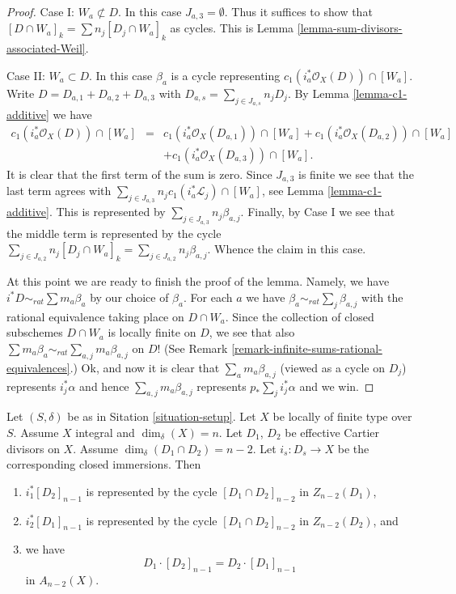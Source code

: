 \begin{proof}
\medskip\noindent
Case I: $W_a \not \subset D$. In this case $J_{a, 3} = \emptyset$.
Thus it suffices to show that
$[D \cap W_a]_k = \sum n_j [D_j \cap W_a]_k$ as cycles.
This is Lemma \ref{lemma-sum-divisors-associated-Weil}.

\medskip\noindent
Case II: $W_a \subset D$. In this case $\beta_a$ is a cycle representing
$c_1(i_a^*\mathcal{O}_X(D)) \cap [W_a]$.
Write $D = D_{a, 1} + D_{a, 2} + D_{a, 3}$ with
$D_{a, s} = \sum_{j \in J_{a, s}} n_jD_j$.
By Lemma \ref{lemma-c1-additive} we have
\begin{eqnarray*}
c_1(i_a^*\mathcal{O}_X(D)) \cap [W_a] & = &
c_1(i_a^*\mathcal{O}_X(D_{a, 1})) \cap [W_a] +
c_1(i_a^*\mathcal{O}_X(D_{a, 2})) \cap [W_a] \\
& &
 + c_1(i_a^*\mathcal{O}_X(D_{a, 3})) \cap [W_a].
\end{eqnarray*}
It is clear that the first term of the sum is zero.
Since $J_{a, 3}$ is finite we see that the last term agrees
with $\sum\nolimits_{j \in J_{a, 3}} n_jc_1(i_a^*\mathcal{L}_j) \cap [W_a]$,
see Lemma \ref{lemma-c1-additive}.
This is represented by $\sum_{j \in J_{a, 3}} n_j \beta_{a, j}$.
Finally, by Case I we see that the middle term is represented by the cycle
$\sum\nolimits_{j \in J_{a, 2}} n_j[D_j \cap W_a]_k =
\sum_{j \in J_{a, 2}} n_j\beta_{a, j}$.
Whence the claim in this case.

\medskip\noindent
At this point we are ready to finish the proof of the lemma.
Namely, we have $i^*D \sim_{rat} \sum m_a\beta_a$ by our
choice of $\beta_a$. For each $a$ we have
$\beta_a \sim_{rat} \sum_j \beta_{a, j}$ with the rational
equivalence taking place on $D \cap W_a$.
Since the collection of closed subschemes $D \cap W_a$
is locally finite on $D$, we see that also
$\sum m_a \beta_a \sim_{rat} \sum_{a, j} m_a\beta_{a, j}$
on $D$! (See Remark \ref{remark-infinite-sums-rational-equivalences}.) 
Ok, and now it is clear that $\sum_a m_a\beta_{a, j}$ (viewed
as a cycle on $D_j$) represents $i_j^*\alpha$ and hence
$\sum_{a, j} m_a\beta_{a, j}$ represents $p_* \sum_j i_j^*\alpha$
and we win.
\end{proof}

\begin{lemma}
\label{lemma-commutativity-effective-Cartier-proper-intersection}
Let $(S, \delta)$ be as in Sitation \ref{situation-setup}.
Let $X$ be locally of finite type over $S$.
Assume $X$ integral and $\dim_\delta(X) = n$.
Let $D_1$, $D_2$ be effective Cartier divisors on $X$.
Assume $\dim_\delta(D_1 \cap D_2) = n - 2$. Let $i_s : D_s \to X$
be the corresponding closed immersions.
Then
\begin{enumerate}
\item $i_1^*[D_2]_{n - 1}$ is represented by the cycle
$[D_1 \cap D_2]_{n - 2}$ in $Z_{n - 2}(D_1)$,
\item $i_2^*[D_1]_{n - 1}$ is represented by the cycle
$[D_1 \cap D_2]_{n - 2}$ in $Z_{n - 2}(D_2)$, and
\item we have
$$
D_1 \cdot [D_2]_{n - 1}
=
D_2 \cdot [D_1]_{n - 1}
$$
in $A_{n - 2}(X)$.
\end{enumerate}
\end{lemma}

